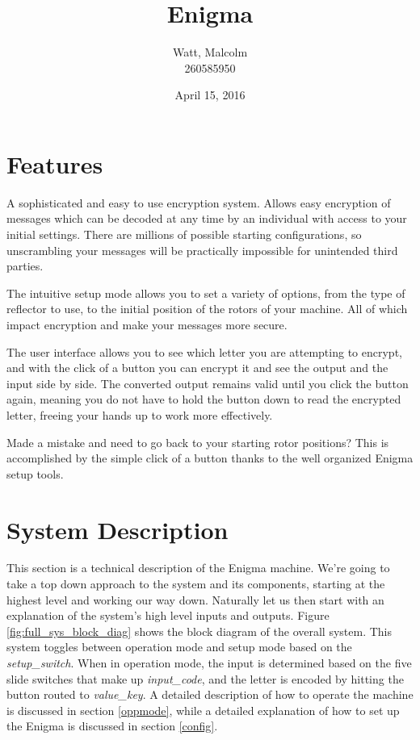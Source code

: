 \documentclass{article}
\title{\Huge{Enigma}}
\author{
    Watt, Malcolm \\
    260585950
}
\date{April 15, 2016}
\begin{document}
\maketitle

\section{Features}
A sophisticated and easy to use encryption system. Allows easy encryption of messages which can be decoded at any time by an individual with access to your initial settings. There are millions of possible starting configurations, so unscrambling your messages will be practically impossible for unintended third parties. 

The intuitive setup mode allows you to set a variety of options, from the type of reflector to use, to the initial position of the rotors of your machine. All of which impact encryption and make your messages more secure. 

The user interface allows you to see which letter you are attempting to encrypt, and with the click of a button you can encrypt it and see the output and the input side by side. The converted output remains valid until you click the button again, meaning you do not have to hold the button down to read the encrypted letter, freeing your hands up to work more effectively. 

Made a mistake and need to go back to your starting rotor positions? This is accomplished by the simple click of a button thanks to the well organized Enigma setup tools.

\clearpage

\tableofcontents

\clearpage

\section{System Description}
This section is a technical description of the Enigma machine. We're going to take a top down approach to the system and its components, starting at the highest level and working our way down. Naturally let us then start with an explanation of the system's high level inputs and outputs. Figure \ref{fig:full_sys_block_diag} shows the block diagram of the overall system. This system toggles between operation mode and setup mode based on the \textit{setup\_switch}. When in operation mode, the input is determined based on the five slide switches that make up \textit{input\_code}, and the letter is encoded by hitting the button routed to \textit{value\_key}. A detailed description of how to operate the machine is discussed in section \ref{oppmode}, while a detailed explanation of how to set up the Enigma is discussed in section \ref{config}. 
\end{document}
